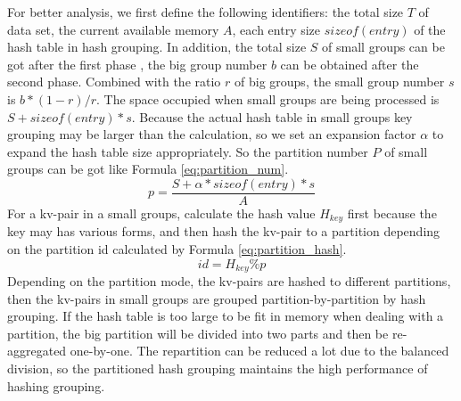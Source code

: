 For better analysis, we first define the following identifiers: the total size $T$ of data set, the current available memory $A$, each entry size $sizeof(entry)$ of the hash table in hash grouping. In addition, the total size $S$ of small groups can be got after the first phase , the big group number $b$ can be obtained after the second phase. Combined with the ratio $r$ of big groups, the small group number $s$ is $b*(1-r)/r$. The space occupied when small groups are being processed is $S + sizeof(entry)*s$. Because the actual hash table in small groups key grouping may be larger than the calculation, so we set an expansion factor $\alpha$ to expand the hash table size appropriately. So the partition number $P$ of small groups can be got like Formula \ref{eq:partition_num}. 
\begin{equation}\label{eq:partition_num}
    p = \dfrac{S + \alpha*sizeof(entry)*s}{A}
\end{equation}
For a kv-pair in a small groups, calculate the hash value $H_{key}$ first because the key may has various forms, and then hash the kv-pair to a partition depending on the partition id calculated by Formula \ref{eq:partition_hash}.
\begin{equation}\label{eq:partition_hash}
    id = H_{key} \%  p
\end{equation}  
Depending on the partition mode, the kv-pairs are hashed to different partitions, then the kv-pairs in small groups are grouped partition-by-partition by hash grouping. If the hash table is too large to be fit in memory when dealing with a partition, the big partition will be divided into two parts and then be re-aggregated one-by-one. The repartition can be reduced a lot due to the balanced division, so the partitioned hash grouping maintains the high performance of hashing grouping. 

